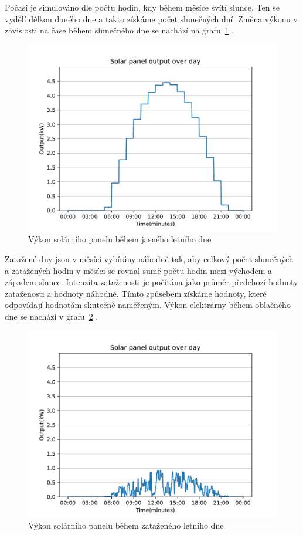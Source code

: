 \documentclass[12pt,a4paper]{Cotmas-2018}
\begin{document}
Počasí je simulováno dle počtu hodin, kdy během měsíce svítí slunce. Ten se vydělí délkou daného dne a takto získáme počet slunečných dní. 
Změna výkonu  v závislosti na čase během slunečného dne se nachází na grafu~\ref{fig:solar_day_clear} \cite{Journal-of-PV-2020}.

\begin{figure}[H]
\begin{center}
\includegraphics[width=0.8\linewidth]{img/solar_day_clear.pdf}
\caption{Výkon solárního panelu během jasného letního dne}
\end{center}
\label{fig:solar_day_clear}
\end{figure}

Zatažené dny jsou v měsíci vybírány náhodně tak, aby celkový počet slunečných a zatažených hodin v měsíci se rovnal sumě počtu hodin mezi východem a západem slunce. Intenzita zataženosti je počítána jako průměr předchozí hodnoty zataženosti a hodnoty náhodné. Tímto způsebem získáme hodnoty, které odpovídají hodnotám skutečně naměřeným. Výkon elektrárny během oblačného dne se nachází v grafu~\ref{fig:solar_day_cloudy} \cite{Zilvar-2022}.

\begin{figure}[H]
\begin{center}
\includegraphics[width=0.8\linewidth]{img/solar_day_cloudy.pdf}
\caption{Výkon solárního panelu během zataženého letního dne}
\end{center}
\label{fig:solar_day_cloudy}
\end{figure}
\end{document}
